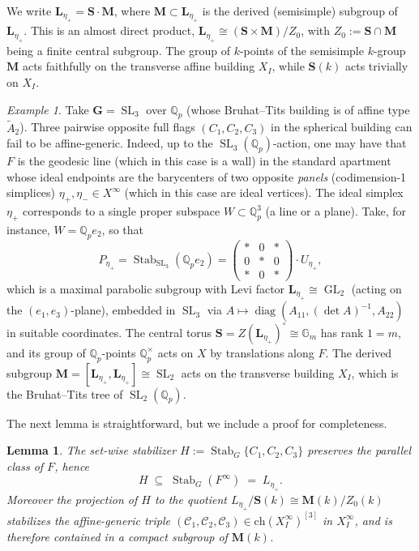 \documentclass[11pt]{amsart}
\newcommand{\bfM}{\mathbf{M}}
\newcommand{\bfS}{\mathbf{S}}
\newcommand{\Ch}{\mathrm{ch}}
\DeclareMathOperator{\Stab}{Stab}
\theoremstyle{plain}
\newtheorem{lem}[thm]{Lemma}
\theoremstyle{definition}
\theoremstyle{remark}
\newtheorem{ex}[thm]{Example}
\begin{document}
We write $\mathbf{L}_{\eta_+} = \mathbf{S} \cdot \mathbf{M}$, where $\mathbf{M} \subset \mathbf{L}_{\eta_+}$ is the derived (semisimple) subgroup of $\mathbf{L}_{\eta_+}$. This is an almost direct product, $\mathbf{L}_{\eta_+} \cong (\mathbf{S} \times \mathbf{M}) / Z_0$, with $Z_0 := \mathbf{S} \cap \mathbf{M}$ being a finite central subgroup. The group of $k$-points of the semisimple $k$-group $\mathbf{M}$ acts faithfully on the transverse affine building $X_I$, while $\mathbf{S}(k)$ acts trivially on $X_I$.
		
	\begin{ex}\label{ex:SL3}
    Take $\mathbf{G}=\operatorname{SL}_3$ over $\mathbb{Q}_p$ (whose Bruhat--Tits building is of affine type $\widetilde{A}_2$). Three pairwise opposite full flags $(C_1,C_2,C_3)$ in the spherical building can fail to be affine-generic. Indeed, up to the $\operatorname{SL}_3(\mathbb{Q}_p)$-action, one may have that $F$ is the geodesic line (which in this case is a wall) in the standard apartment whose ideal endpoints are the barycenters of two opposite \emph{panels} (codimension-1 simplices) $\eta_+,\eta_-\in X^\infty$ (which in this case are ideal vertices). The ideal simplex $\eta_+$ corresponds to a single proper subspace $W\subset\mathbb{Q}_p^3$ (a line or a plane). Take, for instance, $W=\mathbb{Q}_p e_2$, so that
    \[
    P_{\eta_+} = \operatorname{Stab}_{\operatorname{SL}_3}(\mathbb{Q}_p e_2) = \begin{pmatrix} * & 0 & * \\ 0 & * & 0 \\ * & 0 & * \end{pmatrix} \cdot U_{\eta_+},
    \]
    which is a maximal parabolic subgroup with Levi factor $\mathbf{L}_{\eta_+} \cong \operatorname{GL}_2$ (acting on the $(e_1,e_3)$-plane), embedded in $\operatorname{SL}_3$ via $A \mapsto \operatorname{diag}(A_{11}, (\det A)^{-1}, A_{22})$ in suitable coordinates. The central torus $\mathbf{S}=Z(\mathbf{L}_{\eta_+})^\circ \cong \mathbb{G}_m$ has rank $1=m$, and its group of $\mathbb{Q}_p$-points $\mathbb{Q}_p^\times$ acts on $X$ by translations along $F$. The derived subgroup $\mathbf{M}=[\mathbf{L}_{\eta_+},\mathbf{L}_{\eta_+}] \cong \operatorname{SL}_2$ acts on the transverse building $X_I$, which is the Bruhat--Tits tree of $\operatorname{SL}_2(\mathbb{Q}_p)$.
\end{ex}

	
	The next lemma is straightforward, but we include a proof for completeness. 
	\begin{lem}\label{lem:reductions}
		The set-wise stabilizer $H:=\Stab_G\{C_1,C_2,C_3\}$ preserves the parallel class of $F$, hence
		\[
		H \;\subseteq\; \Stab_G(F^\infty) \;=\; L_{\eta_+}.
		\]
		Moreover the projection of $H$ to the quotient $L_{\eta_+}/\bfS(k)\cong\bfM(k)/Z_0(k)$ stabilizes the affine-generic triple $(\mathcal C_1,\mathcal C_2,\mathcal C_3)\in\Ch(X_I^\infty)^{[3]}$ in $X_I^\infty$, and is therefore contained in a compact subgroup of $\bfM(k)$.
	\end{lem}
	
\end{document}

